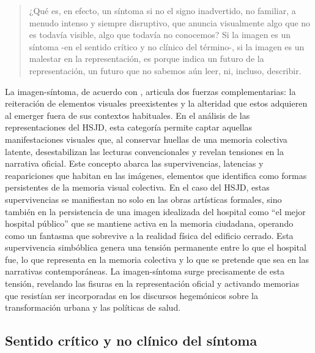 \begin{quote}
¿Qué es, en efecto, un síntoma si no el signo inadvertido, no familiar, a menudo intenso y siempre disruptivo, que anuncia visualmente algo que no es todavía visible, algo que todavía no conocemos? Si la imagen es un síntoma -en el sentido crítico y no clínico del término-, si la imagen es un malestar en la representación, es porque indica un futuro de la representación, un futuro que no sabemos aún leer, ni, incluso, describir. \parencite[p. 307]{DidiHuberman2011}
\end{quote}

\textcolor{edit30sept}{La imagen-síntoma, de acuerdo con \parencite{DidiHuberman2011}, articula dos fuerzas complementarias: la reiteración de elementos visuales preexistentes y la alteridad que estos adquieren al emerger fuera de sus contextos habituales. En el análisis de las representaciones del HSJD, esta categoría permite captar aquellas manifestaciones visuales que, al conservar huellas de una memoria colectiva latente, desestabilizan las lecturas convencionales y revelan tensiones en la narrativa oficial.} Este concepto abarca las supervivencias, latencias y reapariciones que habitan en las imágenes, elementos que \parencite{Warburg2010} identifica como formas persistentes de la memoria visual colectiva. En el caso del HSJD, estas supervivencias se manifiestan no solo en las obras artísticas formales, sino también en la persistencia de una imagen idealizada del hospital como ``el mejor hospital público'' que se mantiene activa en la memoria ciudadana, operando como un fantasma que sobrevive a la realidad física del edificio cerrado. Esta supervivencia simbóblica genera una tensión permanente entre lo que el hospital fue, lo que representa en la memoria colectiva y lo que se pretende que sea en las narrativas contemporáneas. La imagen-síntoma surge precisamente de esta tensión, revelando las fisuras en la representación oficial y activando memorias que resistían ser incorporadas en los discursos hegemónicos sobre la transformación urbana y las políticas de salud.

\subsection*{Sentido crítico y no clínico del síntoma}

